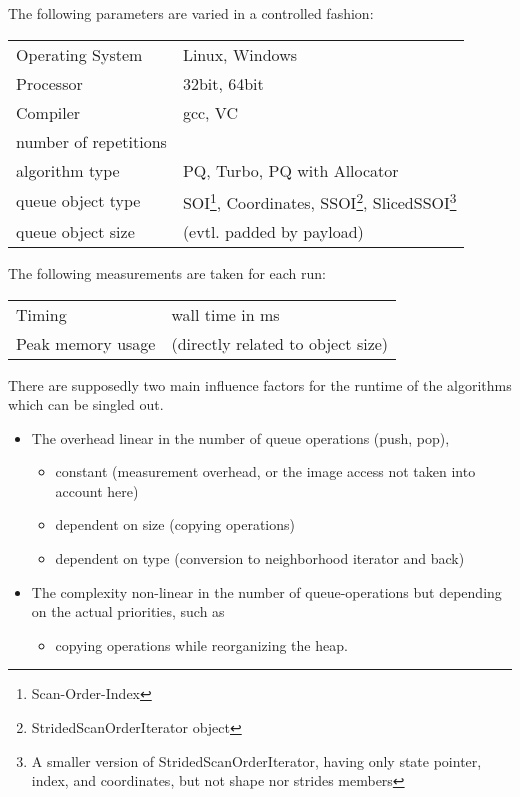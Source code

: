 \documentclass[a4paper,11pt,german]{article}
\theoremstyle{plain}
\theoremstyle{definition}
\theoremstyle{remark}
\begin{document}
The following parameters are varied in a controlled fashion:
\begin{tabular}{ll}
  Operating System & Linux, Windows \\
  Processor & 32bit, 64bit \\
  Compiler & gcc, VC \\ 
 \hline
 number of repetitions & \\
 algorithm type & PQ, Turbo, PQ with Allocator \\
 queue object type & SOI\footnote{Scan-Order-Index}, Coordinates,
 SSOI\footnote{StridedScanOrderIterator object}, SlicedSSOI\footnote{A
 smaller version of StridedScanOrderIterator, having only state
 pointer, index, and coordinates, but not shape nor strides members} \\
 queue object size & (evtl. padded by payload) \\ 
\end{tabular}

The following measurements are taken for each run:
\begin{tabular}{ll}  
  Timing & wall time in ms \\
  Peak memory usage & (directly related to object size) \\ %
\end{tabular}


There are supposedly two main influence factors for the runtime of the
algorithms which can be singled out. 
\begin{itemize}
\item 
  The overhead linear in the number of queue operations (push, pop),
  \begin{itemize}
  \item constant (measurement overhead, or the image access not taken
    into account here)
  \item dependent on size (copying operations)
  \item dependent on type (conversion to neighborhood iterator and back)
  \end{itemize}

\item 
  The complexity non-linear in the number of queue-operations but
  depending on the actual priorities, such as 
  \begin{itemize}
  \item copying operations while reorganizing the heap.
  \end{itemize}

\end{itemize}




\end{document}
